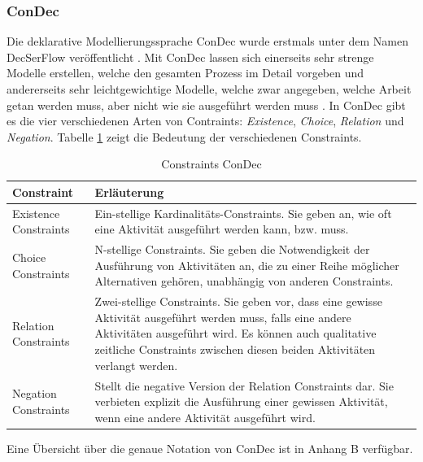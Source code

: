 \subsubsection{ConDec}

Die deklarative Modellierungssprache ConDec wurde erstmals unter dem Namen DecSerFlow veröffentlicht \cite{fahland2010}. Mit ConDec lassen sich einerseits sehr strenge Modelle erstellen, welche den gesamten Prozess im Detail vorgeben und andererseits sehr leichtgewichtige Modelle, welche zwar angegeben, welche Arbeit getan werden muss, aber nicht wie sie ausgeführt werden muss \cite{pesic2006}. \newline
In ConDec gibt es die vier verschiedenen Arten von Contraints: \textit{Existence}, \textit{Choice}, \textit{Relation} und \textit{Negation}. Tabelle \ref{tab:tab3} zeigt die Bedeutung der verschiedenen Constraints. \newline

\begin{table}
\begin{tabular}{|p{}|p{}|}
\hline
\textbf{Constraint} & \textbf{Erläuterung}\\
\hline
Existence Constraints & Ein-stellige Kardinalitäts-Constraints. Sie geben an, wie oft eine Aktivität ausgeführt werden kann, bzw. muss.\\
\hline
Choice Constraints & N-stellige Constraints. Sie geben die Notwendigkeit der Ausführung von Aktivitäten an, die zu einer Reihe möglicher Alternativen gehören, unabhängig von anderen Constraints. \\
\hline
Relation Constraints & Zwei-stellige Constraints. Sie geben vor, dass eine gewisse Aktivität ausgeführt werden muss, falls eine andere Aktivitäten ausgeführt wird. Es können auch qualitative zeitliche Constraints zwischen diesen beiden Aktivitäten verlangt werden.\\
\hline
Negation Constraints & Stellt die negative Version der Relation Constraints dar. Sie verbieten explizit die Ausführung einer gewissen Aktivität, wenn eine andere Aktivität ausgeführt wird.\\
\hline
 \end{tabular}
  \caption{Constraints ConDec \cite{pesic2006}}
\label{tab:tab3}
 \end{table}
 
 Eine Übersicht über die genaue Notation von ConDec ist in Anhang B verfügbar.


